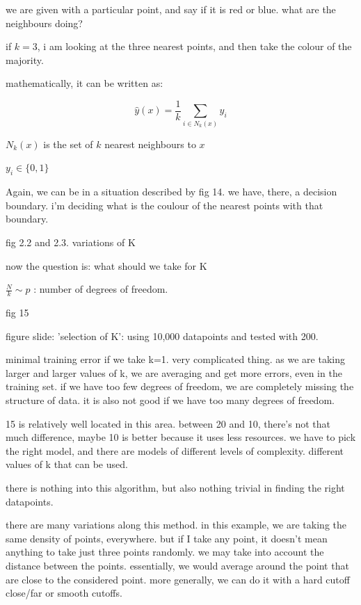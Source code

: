 \documentclass[a4paper]{tufte-book}
\begin{document}
we are given with a particular point, and say if it is red or blue.
what are the neighbours doing?

if $k=3$, i am looking at the three nearest points, and then take the colour of
the majority.

mathematically, it can be written as:

\begin{equation}
    \hat y(x)  = \frac{1}{k} \sum_{i\in N_k(x)} y_i
\end{equation}


$N_k(x)$ is the set of $k$ nearest neighbours to $x$

$y_i \in \{0,1\}$

Again, we can be in a situation described by fig 14.
we have, there, a decision boundary. i'm deciding what is the coulour of the
nearest points with that boundary.

fig 2.2 and 2.3. variations of K

now the question is: what should we take for K

$\frac{N}{k} \sim p$ : number of degrees of freedom.


fig 15

figure slide: 'selection of K': using 10,000 datapoints and tested with 200.

minimal training error if we take k=1. very complicated thing.
as we are taking larger and larger values of k, we are averaging and get more
errors, even in the training set.
if we have too few degrees of freedom, we are completely missing the structure
of data.
it is also not good if we have too many degrees of freedom.

15 is relatively well located in this area.
between 20 and 10, there's not that much difference, maybe 10 is better
because it uses less resources.
we have to pick the right model, and there are models of different levels of
complexity.
different values of k that can be used.

there is nothing into this algorithm, but also nothing trivial in finding the right datapoints.

there are many variations along this method.
in this example, we are taking the same density of points, everywhere. but if I take any point, it doesn't mean anything to take just three points
randomly.
we may take into account the distance between the points.
essentially, we would average around the point that are close to the considered
point. more generally, we can do it with a hard cutoff close/far or smooth
cutoffs.
\end{document}
